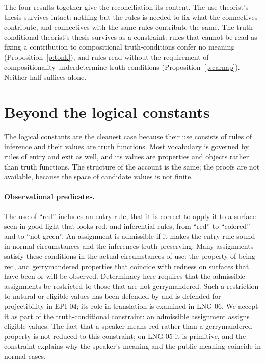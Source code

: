 \documentclass{situationist-preprint}
\begin{document}
The four results together give the reconciliation its content. The use theorist's thesis survives intact: nothing but the rules is needed to fix what the connectives contribute, and connectives with the same rules contribute the same. The truth-conditional theorist's thesis survives as a constraint: rules that cannot be read as fixing a contribution to compositional truth-conditions confer no meaning (Proposition~\ref{p:tonk}), and rules read without the requirement of compositionality underdetermine truth-conditions (Proposition~\ref{p:carnap}). Neither half suffices alone.

\section{Beyond the logical constants}\label{s:beyond}

The logical constants are the cleanest case because their use consists of rules of inference and their values are truth functions. Most vocabulary is governed by rules of entry and exit as well, and its values are properties and objects rather than truth functions. The structure of the account is the same; the proofs are not available, because the space of candidate values is not finite.

\paragraph{Observational predicates.} The use of \enquote{red} includes an entry rule, that it is correct to apply it to a surface seen in good light that looks red, and inferential rules, from \enquote{red} to \enquote{colored} and to \enquote{not green}. An assignment is admissible if it makes the entry rule sound in normal circumstances and the inferences truth-preserving. Many assignments satisfy these conditions in the actual circumstances of use: the property of being red, and gerrymandered properties that coincide with redness on surfaces that have been or will be observed. Determinacy here requires that the admissible assignments be restricted to those that are not gerrymandered. Such a restriction to natural or eligible values has been defended by \citet{Lewis1983} and is defended for projectibility in EPI-04; its role in translation is examined in LNG-06. We accept it as part of the truth-conditional constraint: an admissible assignment assigns eligible values. The fact that a speaker means red rather than a gerrymandered property is not reduced to this constraint; on LNG-05 it is primitive, and the constraint explains why the speaker's meaning and the public meaning coincide in normal cases.
\end{document}
